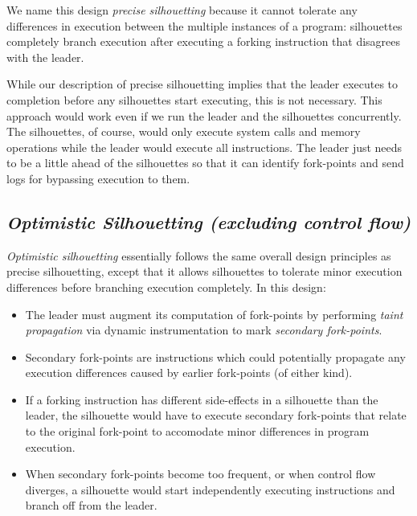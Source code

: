 We name this design {\em precise silhouetting} because
it cannot tolerate any differences in execution
between the multiple instances of a program:
silhouettes completely branch
execution after executing a
forking instruction that disagrees
with the leader. 

While our description of precise silhouetting implies that the leader
executes to completion before any silhouettes 
start executing, this is not necessary.
This approach would work even
if we run the leader and the silhouettes
concurrently. The silhouettes,
of course, would only execute system calls and memory
operations while
the leader would execute all instructions. 
The leader just needs to be a little
ahead of the silhouettes
so that it can identify fork-points
and send logs for bypassing execution to them.

\subsection{\em Optimistic Silhouetting (excluding control flow)}\label{opt:sil}
{\em Optimistic silhouetting} essentially follows the 
same overall design principles
as precise silhouetting,
except that it allows silhouettes
to tolerate minor execution differences 
before branching execution completely.
In this design:

\begin{itemize}

\item The leader must augment its
computation of fork-points by performing 
{\em taint propagation} via dynamic instrumentation to 
mark {\em secondary fork-points}.

\item Secondary fork-points are instructions which 
could potentially propagate any execution differences
caused by earlier fork-points (of either kind).

\item If a forking 
instruction has different
side-effects in a silhouette
than the leader,
the silhouette would have to 
execute secondary fork-points
that relate to the original fork-point to 
accomodate minor differences in program execution.

\item When secondary fork-points 
become too frequent, or when
control flow diverges,
a silhouette would start
independently executing instructions
and branch off from the leader.

\end{itemize}

